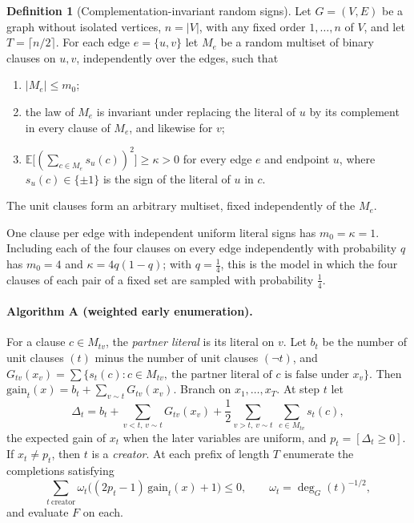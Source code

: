 \documentclass[11pt,a4paper]{article}
\theoremstyle{definition}
\newtheorem{definition}[theorem]{Definition}
\theoremstyle{remark}
\newcommand{\E}{\mathbb E}
\begin{document}
\begin{definition}[Complementation-invariant random signs]\label{def:invariant}
Let $G=(V,E)$ be a graph without isolated vertices, $n=|V|$, with any fixed order
$1,\dots,n$ of $V$, and let $T=\lceil n/2\rceil$. For each edge $e=\{u,v\}$ let
$M_e$ be a random multiset of binary clauses on $u,v$, independently over the
edges, such that
\begin{enumerate}
\item[(i)] $|M_e|\le m_0$;
\item[(ii)] the law of $M_e$ is invariant under replacing the literal of $u$ by
its complement in every clause of $M_e$, and likewise for $v$;
\item[(iii)] $\E\bigl[(\sum_{c\in M_e}s_u(c))^2\bigr]\ge\kappa>0$ for every edge
$e$ and endpoint $u$, where $s_u(c)\in\{\pm1\}$ is the sign of the literal of
$u$ in $c$.
\end{enumerate}
The unit clauses form an arbitrary multiset, fixed independently of the $M_e$.
\end{definition}

One clause per edge with independent uniform literal signs has $m_0=\kappa=1$.
Including each of the four clauses on every edge independently with probability
$q$ has $m_0=4$ and $\kappa=4q(1-q)$; with $q=\frac14$, this is the model in
which the four clauses of each pair of a fixed set are sampled with probability
$\frac14$.

\paragraph{Algorithm A (weighted early enumeration).}
For a clause $c\in M_{tv}$, the \emph{partner literal} is its literal on $v$.
Let $b_t$ be the number of unit clauses $(t)$ minus the number of unit clauses
$(\neg t)$, and $G_{tv}(x_v)=\sum\{s_t(c):c\in M_{tv},\ \text{the partner
literal of $c$ is false under }x_v\}$. Then
$\mathrm{gain}_t(x)=b_t+\sum_{v\sim t}G_{tv}(x_v)$. Branch on $x_1,\dots,x_T$.
At step $t$ let
\[
 \Delta_t=b_t+\sum_{v<t,\,v\sim t}G_{tv}(x_v)
  +\frac12\sum_{v>t,\,v\sim t}\ \sum_{c\in M_{tv}}s_t(c),
\]
the expected gain of $x_t$ when the later variables are uniform, and
$p_t=[\Delta_t\ge0]$. If $x_t\ne p_t$, then $t$ is a \emph{creator}. At each
prefix of length $T$ enumerate the completions satisfying
\begin{equation}\label{eq:weighted}
 \sum_{t\ \text{creator}}\omega_t\bigl((2p_t-1)\,\mathrm{gain}_t(x)+1\bigr)\le0,
 \qquad \omega_t=\deg_G(t)^{-1/2},
\end{equation}
and evaluate $F$ on each.
\end{document}

